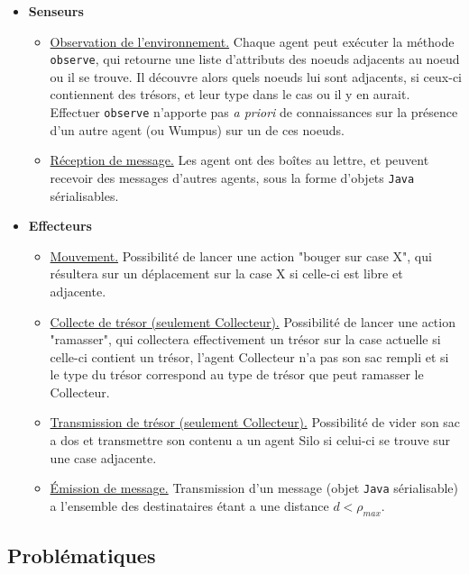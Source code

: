 \documentclass[a4paper, 10pt]{article}
\begin{document}
\begin{itemize}
    \item \textbf{Senseurs}
        \begin{itemize}
            \item \underline{Observation de l'environnement.} Chaque agent peut exécuter la méthode \verb|observe|, qui retourne une liste d'attributs des noeuds adjacents au noeud ou il se trouve. Il découvre alors quels noeuds lui sont adjacents, si ceux-ci contiennent des trésors, et leur type dans le cas ou il y en aurait. Effectuer \verb|observe| n'apporte pas \textit{a priori} de connaissances sur la présence d'un autre agent (ou Wumpus) sur un de ces noeuds.
            \item \underline{Réception de message.} Les agent ont des boîtes au lettre, et peuvent recevoir des messages d'autres agents, sous la forme d'objets \verb|Java| sérialisables.
        \end{itemize}
        
    
    \item \textbf{Effecteurs}
            \begin{itemize}
            \item \underline{Mouvement.} Possibilité de lancer une action "bouger sur case X", qui résultera sur un déplacement sur la case {X} si celle-ci est libre et adjacente.
            \item \underline{Collecte de trésor (seulement Collecteur).} Possibilité de lancer une action "ramasser", qui collectera effectivement un trésor sur la case actuelle si celle-ci contient un trésor, l'agent Collecteur n'a pas son sac rempli et si le type du trésor correspond au type de trésor que peut ramasser le Collecteur.
            \item \underline{Transmission de trésor (seulement Collecteur).} Possibilité de vider son sac a dos et transmettre son contenu a un agent Silo si celui-ci se trouve sur une case adjacente.
            \item \underline{Émission de message.} Transmission d'un message (objet \verb|Java| sérialisable) a l'ensemble des destinataires étant a une distance $d < \rho_{max}$.
        \end{itemize}
\end{itemize}

\subsection{Problématiques}
\end{document}
